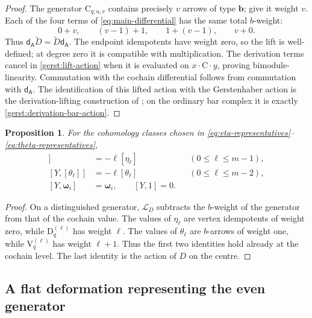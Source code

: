 \documentclass[a4paper,11pt,oneside,reqno]{amsart}
\newtheorem{proposition}[theorem]{Proposition}
\theoremstyle{definition}
\numberwithin{equation}{section}
\begin{document}
\begin{proof}
The generator $\mathrm C_{q;u,v}$ contains precisely $v$ arrows of
type $\mathbf b$; give it weight $v$.  Each of the four terms of
\eqref{eq:main-differential} has the same total $b$-weight:
\[
 0+v,\qquad (v-1)+1,\qquad 1+(v-1),\qquad v+0.
\]
Thus $\mathsf d_{\mathsf A}\widetilde D
=\widetilde D\mathsf d_{\mathsf A}$.
The endpoint idempotents have weight zero, so the lift is well-defined;
at degree zero it is compatible with multiplication.  The derivation
terms cancel in \eqref{gerst:lift-action} when it is evaluated on
$x\cdot\mathrm C\cdot y$, proving bimodule-linearity.  Commutation
with the cochain differential follows from commutation with
$\mathsf d_{\mathsf A}$.  The identification of this lifted action
with the Gerstenhaber action is the derivation-lifting construction of
\cite{SuarezAlvarez}; on the ordinary bar complex it is exactly
\eqref{gerst:derivation-bar-action}.
\end{proof}

\begin{proposition}\label{gerst:degree-one-action}
For the cohomology classes chosen in
\eqref{eq:eta-representatives}--\eqref{eq:theta-representatives},
\begin{align}
 [Y,[\eta_\ell]]&=-\ell[\eta_\ell]
 &&(0\le\ell\le m-1),\label{gerst:eta-weight}\\
 [Y,[\theta_\ell]]&=-\ell[\theta_\ell]
 &&(0\le\ell\le m-2),\label{gerst:theta-weight}\\
 [Y,\boldsymbol\omega_i]&=\boldsymbol\omega_i,
 \qquad [Y,1]=0.\label{gerst:center-weight}
\end{align}
\end{proposition}

\begin{proof}
On a distinguished generator, $\mathcal L_D$ subtracts the
$b$-weight of the generator from that of the cochain value.
The values of $\eta_\ell$ are vertex idempotents of weight zero,
while $\mathrm D_q^{(\ell)}$ has weight $\ell$.
The values of $\theta_\ell$ are $b$-arrows of weight one,
while $\mathrm V_q^{(\ell)}$ has weight $\ell+1$.
Thus the first two identities hold already at the cochain level.
The last identity is the action of $D$ on the centre.
\end{proof}

\subsection{A flat deformation representing the even generator}
\end{document}
